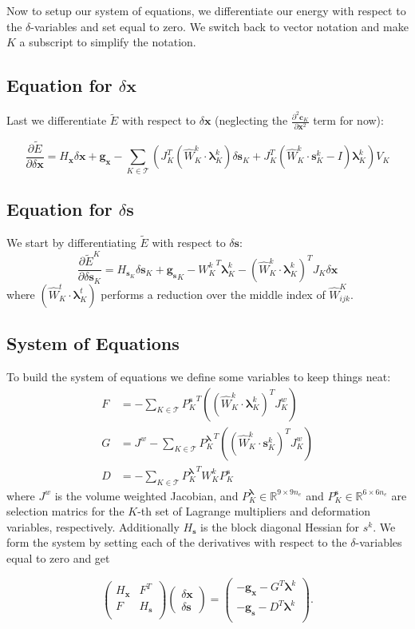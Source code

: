 \documentclass[letterpaper,12pt]{article}
\theoremstyle{remark}
\newcommand{\R}{\mathbb{R}}
\newcommand{\Th}{\mathcal{T}}
\newcommand{\x}{\mathbf{x}}
\newcommand{\C}{\mathbf{c}}
\newcommand{\s}{\mathbf{s}}
\newcommand{\la}{\mathbf{\lambda}}
\newcommand{\dx}{\delta \x}
\newcommand{\ds}{\delta \s}
\newcommand{\Hx}{ {H_\x} }
\newcommand{\Hs}{ {H_\s} }
\newcommand{\Hsk}{ {H_{\s_K}} }
\newcommand{\gx}{ {\mathbf{g}_\x} }
\newcommand{\gs}{ {\mathbf{g}_\s} }
\begin{document}
Now to setup our system of equations, we differentiate our energy with respect to the $\delta$-variables and set equal to zero. We switch back to vector notation and make $K$ a subscript to simplify the notation.


\subsection{Equation for $\dx$}
Last we differentiate $\tilde{E}$ with respect to $\dx$ (neglecting the $\frac{\partial^2 \C_K}{ \partial \x^2}$ term for now):

\begin{equation}
\frac{\partial \tilde{E}}{\partial \dx} = \Hx\dx + \gx 
- \sum_{K \in \Th} \left(
J_K^T(\hat{W}_K^{k}\cdot \la_K^k) \ds_K +
J_K^T(\hat{W}_K^{k}\cdot \s_K^k - I)\la_K^k
\right)V_K
\end{equation}


\subsection{Equation for $\ds$}
We start by differentiating $\tilde{E}$ with respect to $\ds$:
\begin{equation}
\frac{\partial \tilde{E}^K}{\partial \ds_K} =  \Hsk \ds_K + \gs_K  -
{W_K^k}^T \la_K^k - (\hat{W}_K^{k}\cdot \la_K^k)^T J_K \dx
\end{equation}
where $(\hat{W}_K^{t}\cdot \la_K^t)$ performs a reduction over the middle index of $\hat{W}^K_{ijk}$.


\subsection{System of Equations}
To build the system of equations we define some variables to keep things neat:
\begin{align}
F &= - \sum_{K \in \Th} {P_K^\s}^T \left((\hat{W}_K^{k}\cdot \la_K^k)^T J_K^w \right) \\
G &= J^w - \sum_{K \in \Th} {P_K^\la}^T \left((\hat{W}_K^{k}\cdot \s_K^k)^T J_K^w \right) \\
D &= -\sum_{K \in \Th} {P_K^\la}^T  W_K^k P_K^\s
\end{align}
where $J^w$ is the volume weighted Jacobian, and $P_K^\la \in \R^{9 \times 9n_e}$ and $P_K^\s \in \R^{6 \times 6n_e}$ are selection matrics for the $K$-th set of Lagrange multipliers and deformation variables, respectively. Additionally $\Hs$ is the block diagonal Hessian for $s^k$. We form the system by setting each of the derivatives with respect to the $\delta$-variables equal to zero and get

\begin{equation}
\begin{pmatrix}
\Hx & F^T \\
F & \Hs  \\
\end{pmatrix}
\begin{pmatrix}
\dx \\
\ds
\end{pmatrix} =
\begin{pmatrix}
-\gx -G^T \la^k \\
-\gs -D^T \la^k \\
\end{pmatrix}.
\end{equation}
\end{document}
